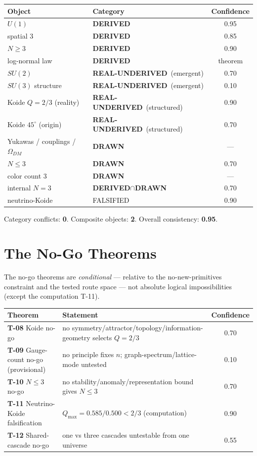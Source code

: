 \documentclass[10pt,twoside,openany]{book}
\newcommand{\derived}{\textbf{DERIVED}}
\newcommand{\realunder}{\textbf{REAL-UNDERIVED}}
\newcommand{\drawn}{\textbf{DRAWN}}
\begin{document}
\begin{center}
\begin{tabular}{llc}
\toprule
Object & Category & Confidence \\
\midrule
$U(1)$ & \derived & 0.95 \\
spatial 3 & \derived & 0.85 \\
$N\ge3$ & \derived & 0.90 \\
log-normal law & \derived & theorem \\
$SU(2)$ & \realunder\ (emergent) & 0.70 \\
$SU(3)$ structure & \realunder\ (emergent) & 0.10 \\
Koide $Q=2/3$ (reality) & \realunder\ (structured) & 0.90 \\
Koide $45^\circ$ (origin) & \realunder\ (structured) & 0.70 \\
Yukawas / couplings / $\Omega_{DM}$ & \drawn & — \\
$N\le3$ & \drawn & 0.70 \\
color count 3 & \drawn & — \\
internal $N=3$ & \derived$\cap$\drawn & 0.70 \\
neutrino-Koide & FALSIFIED & 0.90 \\
\bottomrule
\end{tabular}
\end{center}

Category conflicts: \textbf{0}. Composite objects: \textbf{2}. Overall consistency:
\textbf{0.95}.


\chapter{The No-Go Theorems}
\label{ch:nogo}

The no-go theorems are \emph{conditional} — relative to the no-new-primitives constraint and
the tested route space — not absolute logical impossibilities (except the computation
T-11).

\begin{center}
\begin{tabular}{p{3.4cm}p{9.6cm}c}
\toprule
Theorem & Statement & Confidence \\
\midrule
\textbf{T-08} Koide no-go & no symmetry/attractor/topology/information-geometry selects $Q=2/3$ & 0.70 \\
\textbf{T-09} Gauge-count no-go (provisional) & no principle fixes $n$; graph-spectrum/lattice-mode untested & 0.10 \\
\textbf{T-10} $N\le3$ no-go & no stability/anomaly/representation bound gives $N\le3$ & 0.70 \\
\textbf{T-11} Neutrino-Koide falsification & $Q_{\max}=0.585/0.500 < 2/3$ (computation) & 0.90 \\
\textbf{T-12} Shared-cascade no-go & one vs three cascades untestable from one universe & 0.55 \\
\bottomrule
\end{tabular}
\end{center}
\end{document}
